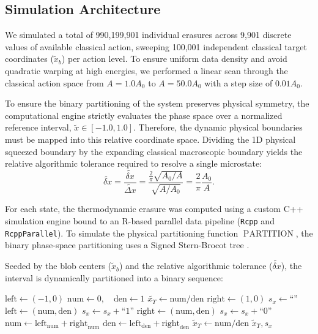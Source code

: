 \documentclass[%
  aps, reprint, prl, amsmath,amssymb
]{revtex4-2}
\begin{document}
\subsection{Simulation Architecture}

We simulated a total of 990,199,901 individual erasures across 9,901 discrete values of available classical action, sweeping 100,001 independent classical target coordinates ($\tilde{x}_b$) per action level. To ensure uniform data density and avoid quadratic warping at high energies, we performed a linear scan through the classical action space from $A = 1.0 A_0$ to $A = 50.0 A_0$ with a step size of $0.01 A_0$.

To ensure the binary partitioning of the system preserves physical symmetry, the computational engine strictly evaluates the phase space over a normalized reference interval, $\tilde{x} \in [-1.0, 1.0]$. Therefore, the dynamic physical boundaries must be mapped into this relative coordinate space. Dividing the 1D physical squeezed boundary by the expanding classical macroscopic boundary yields the relative algorithmic tolerance required to resolve a single microstate:
\begin{equation}
\widetilde{\delta x} = \frac{\widetilde{\delta x}}{\widetilde{\Delta x}} = \frac{\frac{2}{\pi}\sqrt{A_0/A}}{\sqrt{A/A_0}} = \frac{2}{\pi} \frac{A_0}{A}.
\end{equation}
 
 For each state, the thermodynamic erasure was computed using a custom C++ simulation engine bound to an R-based parallel data pipeline (\texttt{Rcpp} and \texttt{RcppParallel}). To simulate the physical partitioning function $\operatorname{PARTITION}$, the binary phase-space partitioning uses a Signed Stern-Brocot tree \cite{ConcreteMath, Niqui2007}.

Seeded by the blob centers ($\tilde{x}_b$) and the relative algorithmic tolerance ($\widetilde{\delta x}$), the interval is dynamically partitioned into a binary sequence:

\begin{algorithmic}[1]
    \State $\text{left} \gets (-1, 0)$
    \State $\text{num} \gets 0, \quad \text{den} \gets 1$
    \State $\widetilde{x_\Upsilon} \gets \text{num} / \text{den}$
    \State $\text{right} \gets (1, 0)$
    \State $s_x \gets \text{``''}$
            \State $\text{left} \gets (\text{num}, \text{den})$
            \State $s_x \gets s_x + \text{``1''}$
        \Else 
            \State $\text{right} \gets (\text{num}, \text{den})$
            \State $s_x \gets s_x + \text{``0''}$
        \EndIf
        \State $\text{num} \gets \text{left}_{\text{num}} + \text{right}_{\text{num}}$
        \State $\text{den} \gets \text{left}_{\text{den}} + \text{right}_{\text{den}}$
        \State $\tilde{x}_\Upsilon \gets \text{num} / \text{den}$
    \EndWhile
    \State \Return $\tilde{x}_\Upsilon, s_x$
\EndFunction
\end{algorithmic}
\end{document}

